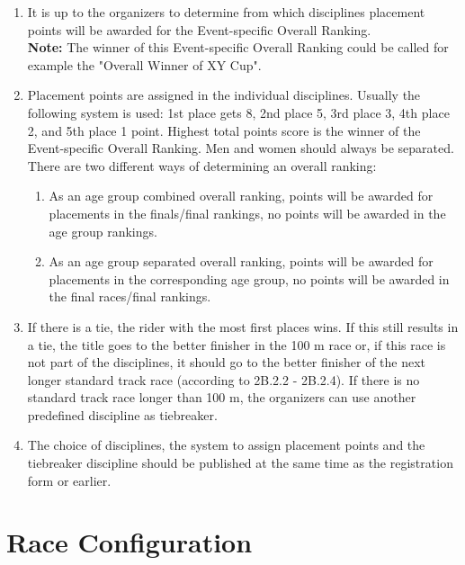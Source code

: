 \begin{enumerate}[leftmargin=1.5em,labelsep=*]
	\item It is up to the organizers to determine from which disciplines placement points will be awarded for the 
  Event-specific Overall Ranking.\\
	\textbf{Note:} The winner of this Event-specific Overall Ranking could be called for example 
  the "Overall Winner of XY Cup".
	\item Placement points are assigned in the individual disciplines.
    Usually the following system is used: 1st place gets 8, 2nd place 5, 3rd place 3, 4th place 2, 
    and 5th place 1 point.
    Highest total points score is the winner of the Event-specific Overall Ranking.
    Men and women should always be separated.
    There are two different ways of determining an overall ranking:
	
	\begin{enumerate}[label*=\arabic*,leftmargin=1.5em,labelsep=*]
		\item As an age group combined overall ranking, points will be awarded for placements in the 
    finals/final rankings, no points will be awarded in the age group rankings.
		
		\item As an age group separated overall ranking, points will be awarded for placements in the 
    corresponding age group, no points will be awarded in the final races/final rankings.
	\end{enumerate}
	
	\item If there is a tie, the rider with the most first places wins.
    If this still results in a tie, the title goes to the better finisher in the 100 m race or, 
    if this race is not part of the disciplines, it should go to the better finisher of the next 
    longer standard track race (according to 2B.2.2 - 2B.2.4).
    If there is no standard track race longer than 100 m, the organizers can use another predefined 
    discipline as tiebreaker.
	\item The choice of disciplines, the system to assign placement points and the tiebreaker discipline 
    should be published at the same time as the registration form or earlier.
\end{enumerate}

\section{Race Configuration}

